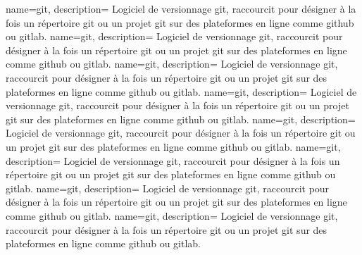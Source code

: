 
{
    name={git},
    description={
    Logiciel de versionnage git, raccourcit pour désigner à la fois un répertoire git ou un projet git sur des plateformes en ligne comme github ou gitlab.
    }
    name={git},
    description={
    Logiciel de versionnage git, raccourcit pour désigner à la fois un répertoire git ou un projet git sur des plateformes en ligne comme github ou gitlab.
    }
    name={git},
    description={
    Logiciel de versionnage git, raccourcit pour désigner à la fois un répertoire git ou un projet git sur des plateformes en ligne comme github ou gitlab.
    }
    name={git},
    description={
    Logiciel de versionnage git, raccourcit pour désigner à la fois un répertoire git ou un projet git sur des plateformes en ligne comme github ou gitlab.
    }
    name={git},
    description={
    Logiciel de versionnage git, raccourcit pour désigner à la fois un répertoire git ou un projet git sur des plateformes en ligne comme github ou gitlab.
    }
    name={git},
    description={
    Logiciel de versionnage git, raccourcit pour désigner à la fois un répertoire git ou un projet git sur des plateformes en ligne comme github ou gitlab.
    }
    name={git},
    description={
    Logiciel de versionnage git, raccourcit pour désigner à la fois un répertoire git ou un projet git sur des plateformes en ligne comme github ou gitlab.
    }
    name={git},
    description={
    Logiciel de versionnage git, raccourcit pour désigner à la fois un répertoire git ou un projet git sur des plateformes en ligne comme github ou gitlab.
    }
}